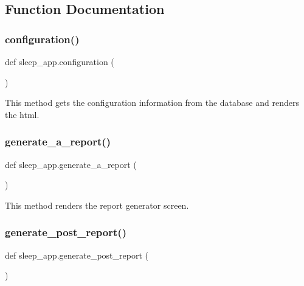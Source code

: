 \subsection{Function Documentation}
\mbox{\label{namespacesleep__app_a7276ce3776474c5713c6520ac8890157}} 
\subsubsection{\texorpdfstring{configuration()}{configuration()}}
{\footnotesize\ttfamily def sleep\+\_\+app.\+configuration (\begin{DoxyParamCaption}{ }\end{DoxyParamCaption})}



This method gets the configuration information from the database and renders the html. 

\mbox{\label{namespacesleep__app_aa0cc2c43bae36abfe4a0824a3afa2e80}} 
\subsubsection{\texorpdfstring{generate\+\_\+a\+\_\+report()}{generate\_a\_report()}}
{\footnotesize\ttfamily def sleep\+\_\+app.\+generate\+\_\+a\+\_\+report (\begin{DoxyParamCaption}{ }\end{DoxyParamCaption})}



This method renders the report generator screen. 

\mbox{\label{namespacesleep__app_aadd0af86ba51234f2888f2bd03fe4d00}} 
\subsubsection{\texorpdfstring{generate\+\_\+post\+\_\+report()}{generate\_post\_report()}}
{\footnotesize\ttfamily def sleep\+\_\+app.\+generate\+\_\+post\+\_\+report (\begin{DoxyParamCaption}{ }\end{DoxyParamCaption})}



